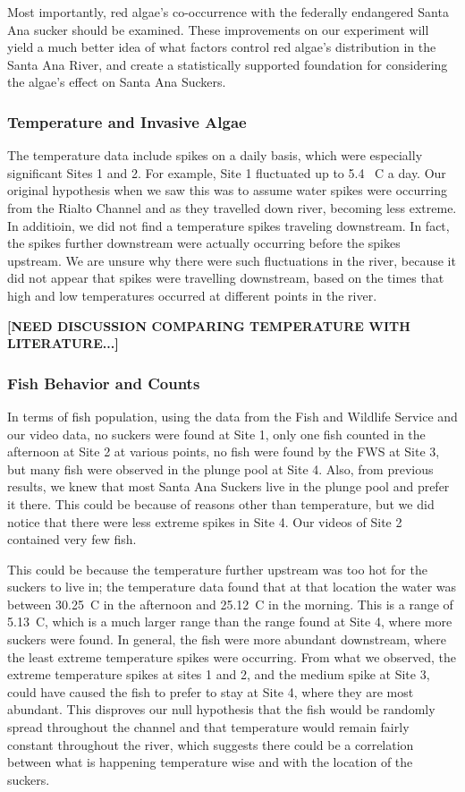 \documentclass{article}\usepackage[]{graphicx}\usepackage[]{color}
\begin{document}
Most importantly, red algae's co-occurrence with the federally endangered Santa Ana sucker should be examined. These improvements on our experiment will yield a much better idea of what factors control red algae's distribution in the Santa Ana River, and create a statistically supported foundation for considering the algae's effect on Santa Ana Suckers.

\subsubsection{Temperature and Invasive Algae}

The temperature data include spikes on a daily basis, which were especially significant Sites 1 and 2. For example, Site 1 fluctuated up to 5.4 \textdegree~C a day. Our original hypothesis when we saw this was to assume water spikes were occurring from the Rialto Channel and as they travelled down river, becoming less extreme. In additioin, we did not find a temperature spikes traveling downstream. In fact, the spikes further downstream were actually occurring before the spikes upstream. We are unsure why there were such fluctuations in the river, because it did not appear that spikes were travelling downstream, based on the times that high and low temperatures occurred at different points in the river. 

\textbf{[NEED DISCUSSION COMPARING TEMPERATURE WITH LITERATURE...]}

\subsubsection{Fish Behavior and Counts}

In terms of fish population, using the data from the Fish and Wildlife Service and our video data, no suckers were found at Site 1, only one fish counted in the afternoon at Site 2 at various points, no fish were found by the FWS at Site 3, but many fish were observed in the plunge pool at Site 4. Also, from previous results, we knew that most Santa Ana Suckers live in the plunge pool and prefer it there. This could be because of reasons other than temperature, but we did notice that there were less extreme spikes in Site 4. Our videos of Site 2 contained very few fish. 

This could be because the temperature further upstream was too hot for the suckers to live in; the temperature data found that at that location the water was between 30.25\textdegree~C in the afternoon and 25.12\textdegree~C in the morning. This is a range of 5.13\textdegree~C, which is a much larger range than the range found at Site 4, where more suckers were found. In general, the fish were more abundant downstream, where the least extreme temperature spikes were occurring. From what we observed, the extreme temperature spikes at sites 1 and 2, and the medium spike at Site 3, could have caused the fish to prefer to stay at Site 4, where they are most abundant. This disproves our null hypothesis that the fish would be randomly spread throughout the channel and that temperature would remain fairly constant throughout the river, which suggests there could be a correlation between what is happening temperature wise and with the location of the suckers.
\end{document}
